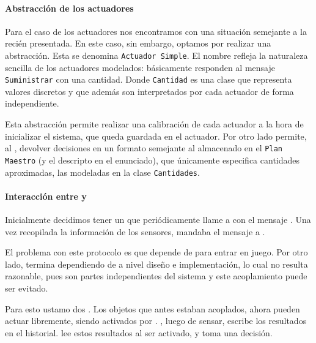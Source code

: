   \paragraph{Abstracci\'on de los actuadores}
  Para el caso de los actuadores nos encontramos con una situaci\'on semejante
  a la reci\'en presentada. En este caso, sin embargo, optamos por realizar
  una abstracci\'on. Esta se denomina \texttt{Actuador Simple}. El nombre
  refleja la naturaleza sencilla de los actuadores modelados: b\'asicamente
  responden al mensaje \texttt{Suministrar} con una cantidad. Donde
  \texttt{Cantidad} es una clase que representa valores discretos y que adem\'as
  son interpretados por cada actuador de forma independiente.

  Esta abstracci\'on permite realizar una calibraci\'on de cada actuador a la
  hora de inicializar el sistema, que queda
  guardada en el actuador. Por otro lado permite, al \decisiones,
  devolver decisiones en un formato semejante al almacenado en el
  \texttt{Plan Maestro} (y el descripto en el enunciado), que \'unicamente
  especifica cantidades aproximadas, las modeladas en la clase
  \texttt{Cantidades}.

  \paragraph{Interacci\'on entre \decisiones y \condiciones}
  Inicialmente decidimos tener un \timer que peri\'odicamente llame a \condiciones
  con el mensaje \sensarCondiciones. Una vez recopilada la informaci\'on de los
  sensores, \condiciones mandaba el mensaje \tomarDecisiones a \decisiones.

  El problema con este protocolo es que \decisiones depende de \condiciones
  para entrar en juego. Por otro lado, \condiciones termina dependiendo de
  \condiciones a nivel dise\~no e implementaci\'on, lo cual no resulta razonable,
  pues son partes independientes del sistema y este acoplamiento puede ser evitado.

  Para esto ustamo dos \timer. Los objetos que antes estaban acoplados, ahora
  pueden actuar libremente, siendo activados por \timer. \condiciones, luego
  de sensar, escribe los resultados en el historial. \decisiones lee estos
  resultados al ser activado, y toma una decisi\'on.

